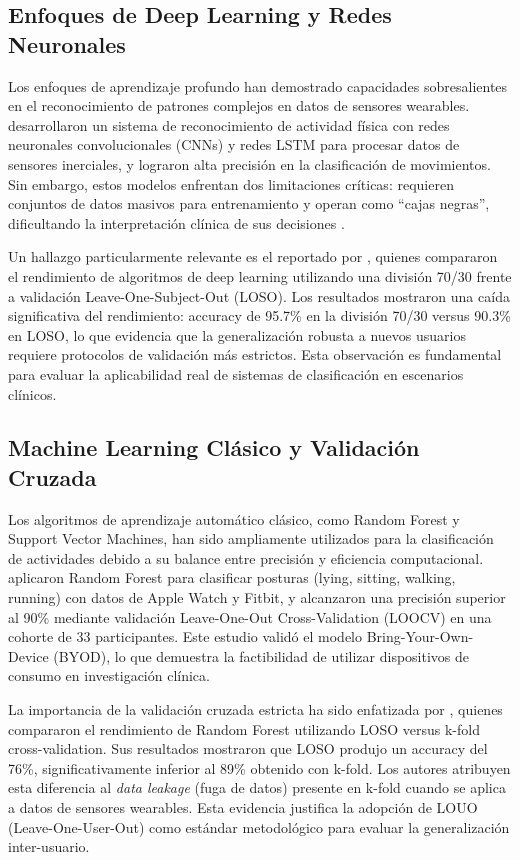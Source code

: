 \subsection{Enfoques de Deep Learning y Redes Neuronales}
\label{subsec:deep_learning}

Los enfoques de aprendizaje profundo han demostrado capacidades sobresalientes en el reconocimiento de patrones complejos en datos de sensores wearables. \cite{Khan2024Wearable} desarrollaron un sistema de reconocimiento de actividad física con redes neuronales convolucionales (CNNs) y redes LSTM para procesar datos de sensores inerciales, y lograron alta precisión en la clasificación de movimientos. Sin embargo, estos modelos enfrentan dos limitaciones críticas: requieren conjuntos de datos masivos para entrenamiento y operan como ``cajas negras'', dificultando la interpretación clínica de sus decisiones \cite{Bienefeld2023XAI}.

Un hallazgo particularmente relevante es el reportado por \cite{Bassani2025DLHAR}, quienes compararon el rendimiento de algoritmos de deep learning utilizando una división 70/30 frente a validación Leave-One-Subject-Out (LOSO). Los resultados mostraron una caída significativa del rendimiento: accuracy de 95.7\% en la división 70/30 versus 90.3\% en LOSO, lo que evidencia que la generalización robusta a nuevos usuarios requiere protocolos de validación más estrictos. Esta observación es fundamental para evaluar la aplicabilidad real de sistemas de clasificación en escenarios clínicos.

\subsection{Machine Learning Clásico y Validación Cruzada}
\label{subsec:ml_clasico}

Los algoritmos de aprendizaje automático clásico, como Random Forest y Support Vector Machines, han sido ampliamente utilizados para la clasificación de actividades debido a su balance entre precisión y eficiencia computacional. \cite{Fuller2021Predicting} aplicaron Random Forest para clasificar posturas (lying, sitting, walking, running) con datos de Apple Watch y Fitbit, y alcanzaron una precisión superior al 90\% mediante validación Leave-One-Out Cross-Validation (LOOCV) en una cohorte de 33 participantes. Este estudio validó el modelo Bring-Your-Own-Device (BYOD), lo que demuestra la factibilidad de utilizar dispositivos de consumo en investigación clínica.

La importancia de la validación cruzada estricta ha sido enfatizada por \cite{Rehman2024LOSO}, quienes compararon el rendimiento de Random Forest utilizando LOSO versus k-fold cross-validation. Sus resultados mostraron que LOSO produjo un accuracy del 76\%, significativamente inferior al 89\% obtenido con k-fold. Los autores atribuyen esta diferencia al \textit{data leakage} (fuga de datos) presente en k-fold cuando se aplica a datos de sensores wearables. Esta evidencia justifica la adopción de LOUO (Leave-One-User-Out) como estándar metodológico para evaluar la generalización inter-usuario.

